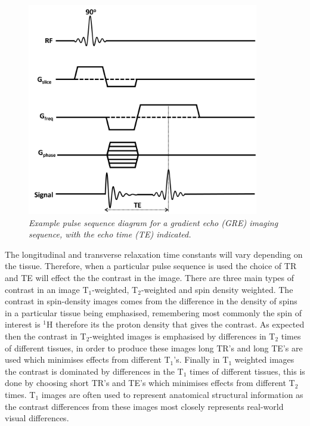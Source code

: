 \documentclass[class=article, crop=false]{standalone}
\begin{document}
\begin{figure}
    \centering
    \includegraphics[width=0.9\textwidth]{Figures/Theory/GRE_sequence.png}
    \caption{\textit{Example pulse sequence diagram for a gradient echo (GRE) imaging sequence, with the echo time (TE) indicated.}}
    \label{fig:theory:GRE}
\end{figure}

The longitudinal and transverse relaxation time constants will vary depending on the tissue. Therefore, when a particular pulse sequence is used the choice of TR and TE will effect the the contrast in the image. There are three main types of contrast in an image T$_1$-weighted, T$_2$-weighted and spin density weighted. The contrast in spin-density images comes from the difference in the density of spins in a particular tissue being emphasised, remembering most commonly the spin of interest is $^1$H therefore its the proton density that gives the contrast. As expected then the contrast in T$_2$-weighted images is emphasised by differences in T$_2$ times of different tissues, in order to produce these images long TR's and long TE's are used which minimises effects from different T$_1$'s. Finally in T$_1$ weighted images the contrast is dominated by differences in the T$_1$ times of different tissues, this is done by choosing short TR's and TE's which minimises effects from different T$_2$ times. T$_1$ images are often used to represent anatomical structural information as the contrast differences from these images most closely represents real-world visual differences. 
\end{document}
